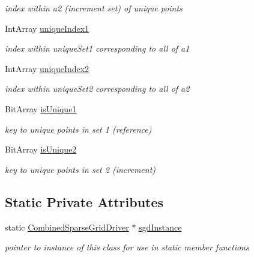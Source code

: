 \begin{DoxyCompactItemize}
\begin{DoxyCompactList}\small\item\em index within a2 (increment set) of unique points \end{DoxyCompactList}\item 
Int\+Array \hyperlink{classPecos_1_1CombinedSparseGridDriver_a7607c386a6c08f235bdfad69c0937f7f}{unique\+Index1}\label{classPecos_1_1CombinedSparseGridDriver_a7607c386a6c08f235bdfad69c0937f7f}

\begin{DoxyCompactList}\small\item\em index within unique\+Set1 corresponding to all of a1 \end{DoxyCompactList}\item 
Int\+Array \hyperlink{classPecos_1_1CombinedSparseGridDriver_a577f382112f6dd0559474bb9cb71a015}{unique\+Index2}\label{classPecos_1_1CombinedSparseGridDriver_a577f382112f6dd0559474bb9cb71a015}

\begin{DoxyCompactList}\small\item\em index within unique\+Set2 corresponding to all of a2 \end{DoxyCompactList}\item 
Bit\+Array \hyperlink{classPecos_1_1CombinedSparseGridDriver_aeecc374a27a3acd87b5dfc42e81ca511}{is\+Unique1}\label{classPecos_1_1CombinedSparseGridDriver_aeecc374a27a3acd87b5dfc42e81ca511}

\begin{DoxyCompactList}\small\item\em key to unique points in set 1 (reference) \end{DoxyCompactList}\item 
Bit\+Array \hyperlink{classPecos_1_1CombinedSparseGridDriver_a7716c733bc8fff78b4a7feefbf1c4b29}{is\+Unique2}\label{classPecos_1_1CombinedSparseGridDriver_a7716c733bc8fff78b4a7feefbf1c4b29}

\begin{DoxyCompactList}\small\item\em key to unique points in set 2 (increment) \end{DoxyCompactList}\end{DoxyCompactItemize}
\subsection*{Static Private Attributes}
\begin{DoxyCompactItemize}
\item 
static \hyperlink{classPecos_1_1CombinedSparseGridDriver}{Combined\+Sparse\+Grid\+Driver} $\ast$ \hyperlink{classPecos_1_1CombinedSparseGridDriver_ab59a7e6f0acf79265a38279b0d4350d0}{sgd\+Instance}
\begin{DoxyCompactList}\small\item\em pointer to instance of this class for use in static member functions \end{DoxyCompactList}\end{DoxyCompactItemize}
